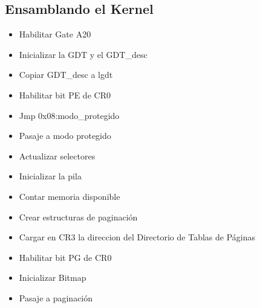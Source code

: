 \documentclass[11pt, a4paper]{article}
\begin{document}
\subsection{Ensamblando el Kernel}
\label{kernel}	
\begin{itemize}
\item Habilitar Gate A20
\item Inicializar la GDT y el GDT\_desc
\item Copiar GDT\_desc a lgdt
\item Habilitar bit PE de CR0
\item Jmp 0x08:modo\_protegido
\item Pasaje a modo protegido
\item Actualizar selectores
\item Inicializar la pila
\item Contar memoria disponible
\item Crear estructuras de paginación
\item Cargar en CR3 la direccion del Directorio de Tablas de Páginas
\item Habilitar bit PG de CR0
\item Inicializar Bitmap
\item Pasaje a paginación
\end{itemize}
\end{document}
